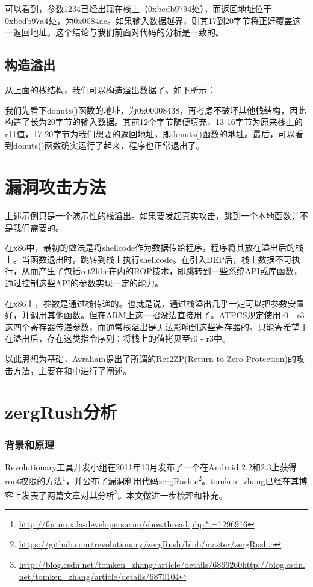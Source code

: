

可以看到，参数1234已经出现在栈上（0xbedb9794处），而返回地址位于0xbedb97a4处，为0x0084ac。如果输入数据越界，则其17到20字节将正好覆盖这一返回地址。这个结论与我们前面对代码的分析是一致的。

\subsection{构造溢出}
从上面的栈结构，我们可以构造溢出数据了。如下所示：



我们先看下donuts()函数的地址，为0x00008438，再考虑不破坏其他栈结构，因此构造了长为20字节的输入数据。其前12个字节随便填充，13-16字节为原来栈上的r11值，17-20字节为我们想要的返回地址，即donuts()函数的地址。最后，可以看到donuts()函数确实运行了起来，程序也正常退出了。

\section{漏洞攻击方法}
上述示例只是一个演示性的栈溢出。如果要发起真实攻击，跳到一个本地函数并不是我们需要的。

在x86中，最初的做法是将shellcode作为数据传给程序，程序将其放在溢出后的栈上。当函数退出时，跳转到栈上执行shellcode。在引入DEP后，栈上数据不可执行，从而产生了包括ret2libc在内的ROP技术，即跳转到一些系统API或库函数，通过控制这些API的参数实现一定的能力。

在x86上，参数是通过栈传递的。也就是说，通过栈溢出几乎一定可以把参数安置好，并调用其他函数。但在ARM上这一招没法直接用了。ATPCS规定使用r0 - r3这四个寄存器传递参数，而通常栈溢出是无法影响到这些寄存器的。只能寄希望于在溢出后，存在这类指令序列：将栈上的值拷贝至r0 - r3中。

以此思想为基础，Avraham提出了所谓的Ret2ZP(Return to Zero Protection)的攻击方法，主要在\cite{arm_stack_exploitation}和\cite{arm_exploitation}中进行了阐述。

\section{zergRush分析}
\subsubsection{背景和原理}
Revolutionary工具开发小组在2011年10月发布了一个在Android 2.2和2.3上获得root权限的方法\footnote{\url{http://forum.xda-developers.com/showthread.php?t=1296916}}，并公布了漏洞利用代码zergRush.c\footnote{\url{https://github.com/revolutionary/zergRush/blob/master/zergRush.c}}。tomken\_zhang已经在其博客上发表了两篇文章对其分析\footnote{\url{http://blog.csdn.net/tomken\_zhang/article/details/6866260}\newline\url{http://blog.csdn.net/tomken\_zhang/article/details/6870104}}。本文做进一步梳理和补充。


